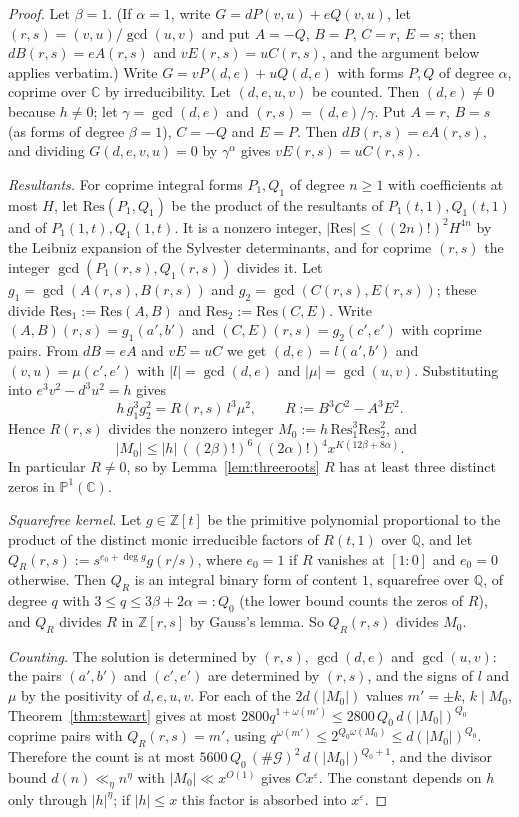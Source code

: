 \documentclass[11pt,reqno]{amsart}
\theoremstyle{definition}
\theoremstyle{remark}
\numberwithin{equation}{section}
\newcommand{\Z}{\mathbb Z}
\newcommand{\Q}{\mathbb Q}
\newcommand{\C}{\mathbb C}
\newcommand{\PP}{\mathbb P}
\begin{document}
\begin{proof}
Let $\beta=1$. (If $\alpha=1$, write $G=dP(v,u)+eQ(v,u)$, let
$(r,s)=(v,u)/\gcd(u,v)$ and put $A=-Q$, $B=P$, $C=r$, $E=s$; then
$dB(r,s)=eA(r,s)$ and $vE(r,s)=uC(r,s)$, and the argument below applies
verbatim.) Write $G=vP(d,e)+uQ(d,e)$ with forms $P,Q$ of degree $\alpha$,
coprime over $\C$ by irreducibility. Let $(d,e,u,v)$ be counted. Then
$(d,e)\ne0$ because $h\ne0$; let $\gamma=\gcd(d,e)$ and $(r,s)=(d,e)/\gamma$.
Put $A=r$, $B=s$ (as forms of degree $\beta=1$), $C=-Q$ and $E=P$. Then
$dB(r,s)=eA(r,s)$, and dividing $G(d,e,v,u)=0$ by $\gamma^\alpha$ gives
$vE(r,s)=uC(r,s)$.

\emph{Resultants.} For coprime integral forms $P_1,Q_1$ of degree $n\ge1$
with coefficients at most $H$, let $\mathrm{Res}(P_1,Q_1)$ be the product of
the resultants of $P_1(t,1),Q_1(t,1)$ and of $P_1(1,t),Q_1(1,t)$. It is a
nonzero integer, $|\mathrm{Res}|\le((2n)!)^2H^{4n}$ by the Leibniz expansion
of the Sylvester determinants, and for coprime $(r,s)$ the integer
$\gcd(P_1(r,s),Q_1(r,s))$ divides it. Let $g_1=\gcd(A(r,s),B(r,s))$ and
$g_2=\gcd(C(r,s),E(r,s))$; these divide $\mathrm{Res}_1:=\mathrm{Res}(A,B)$
and $\mathrm{Res}_2:=\mathrm{Res}(C,E)$. Write $(A,B)(r,s)=g_1(a',b')$ and
$(C,E)(r,s)=g_2(c',e')$ with coprime pairs. From $dB=eA$ and $vE=uC$ we get
$(d,e)=l(a',b')$ and $(v,u)=\mu(c',e')$ with $|l|=\gcd(d,e)$ and
$|\mu|=\gcd(u,v)$. Substituting into $e^3v^2-d^3u^2=h$ gives
\[
h\,g_1^3g_2^2=R(r,s)\,l^3\mu^2,\qquad R:=B^3C^2-A^3E^2 .
\]
Hence $R(r,s)$ divides the nonzero integer
$M_0:=h\,\mathrm{Res}_1^3\mathrm{Res}_2^2$, and
\[
|M_0|\le|h|\,((2\beta)!)^6((2\alpha)!)^4x^{K(12\beta+8\alpha)}.
\]
In particular
$R\ne0$, so by Lemma~\ref{lem:threeroots} $R$ has at least three distinct
zeros in $\PP^1(\C)$.

\emph{Squarefree kernel.} Let $g\in\Z[t]$ be the primitive polynomial
proportional to the product of the distinct monic irreducible factors of
$R(t,1)$ over $\Q$, and let $Q_R(r,s):=s^{e_0+\deg g}g(r/s)$, where $e_0=1$
if $R$ vanishes at $[1:0]$ and $e_0=0$ otherwise. Then $Q_R$ is an integral
binary form of content $1$, squarefree over $\Q$, of degree $q$ with
$3\le q\le3\beta+2\alpha=:Q_0$ (the lower bound counts the zeros of $R$),
and $Q_R$ divides $R$ in $\Z[r,s]$ by Gauss's lemma. So $Q_R(r,s)$ divides
$M_0$.

\emph{Counting.} The solution is determined by $(r,s)$, $\gcd(d,e)$ and
$\gcd(u,v)$: the pairs $(a',b')$ and $(c',e')$ are determined by $(r,s)$, and
the signs of $l$ and $\mu$ by the positivity of $d,e,u,v$. For each of the
$2d(|M_0|)$ values $m'=\pm k$, $k\mid M_0$, Theorem~\ref{thm:stewart} gives at
most $2800q^{1+\omega(m')}\le2800\,Q_0\,d(|M_0|)^{Q_0}$ coprime pairs with
$Q_R(r,s)=m'$, using $q^{\omega(m')}\le2^{Q_0\omega(M_0)}\le d(|M_0|)^{Q_0}$.
Therefore the count is at most
$5600\,Q_0\,(\#\mathcal G)^2\,d(|M_0|)^{Q_0+1}$, and the divisor bound
$d(n)\ll_\eta n^\eta$ with $|M_0|\ll x^{O(1)}$ gives $Cx^\varepsilon$. The
constant depends on $h$ only through $|h|^\eta$; if $|h|\le x$ this factor is
absorbed into $x^\varepsilon$.
\end{proof}
\end{document}
